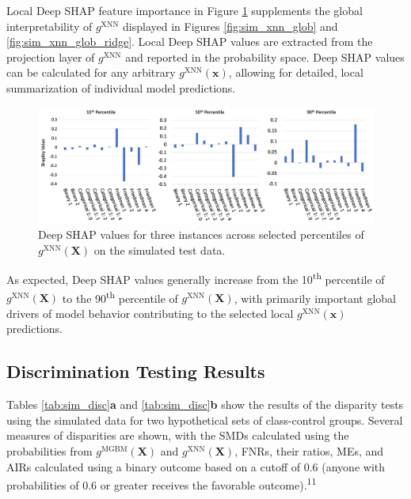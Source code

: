 \documentclass[information,article,submit,moreauthors,pdftex]{definitions/mdpi}
\begin{document}
Local Deep SHAP feature importance in Figure \ref{fig:sim_xnn_loc} supplements the global interpretability of $g^\text{XNN}$ displayed in Figures \ref{fig:sim_xnn_glob} and \ref{fig:sim_xnn_glob_ridge}. Local Deep SHAP values are extracted from the projection layer of $g^\text{XNN}$ and reported in the probability space. Deep SHAP values can be calculated for any arbitrary $g^\text{XNN}(\mathbf{x})$, allowing for detailed, local summarization of individual model predictions. 

\begin{figure}[htb]
	\centering
	\includegraphics[width=15cm]{img/sim_xnn_loc.png}
	\caption{Deep SHAP values for three instances across selected percentiles of $g^\text{XNN}(\mathbf{X})$ on the simulated test data.}
	\label{fig:sim_xnn_loc}
\end{figure}  

\noindent As expected, Deep SHAP values generally increase from the 10\textsuperscript{th} percentile of $g^\text{XNN}(\mathbf{X})$ to the 90\textsuperscript{th} percentile of $g^\text{XNN}(\mathbf{X})$, with primarily important global drivers of model behavior contributing to the selected local $g^\text{XNN}(\mathbf{x})$ predictions.

\subsection{Discrimination Testing Results}\label{a_ssec:dis_sim}

Tables \ref{tab:sim_disc}\textbf{a} and \ref{tab:sim_disc}\textbf{b} show the results of the disparity tests using the simulated data for two hypothetical sets of class-control groups.  Several measures of disparities are shown, with the SMDs calculated using the probabilities from $g^{\text{MGBM}}(\mathbf{X})$ and  $g^{\text{XNN}}(\mathbf{X})$, FNRs, their ratios, MEs, and AIRs calculated using a binary outcome based on a cutoff of 0.6 (anyone with probabilities of 0.6 or greater receives the favorable outcome).\textsuperscript{11}
\end{document}
